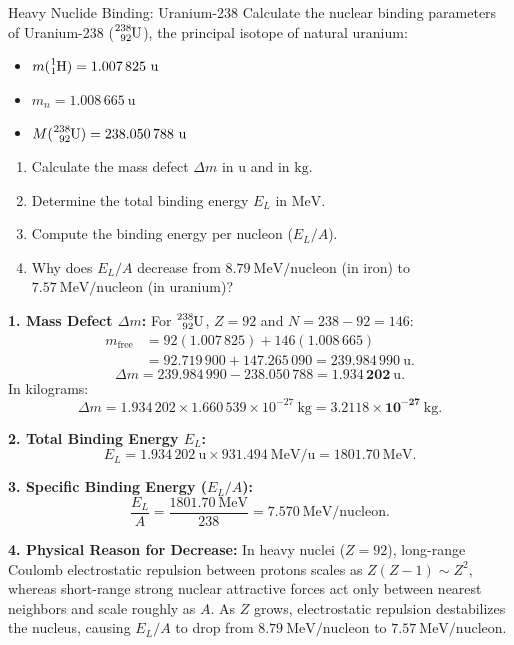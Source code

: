 \begin{exercise}{Heavy Nuclide Binding: Uranium-238}
Calculate the nuclear binding parameters of Uranium-238 ($\ce{^{238}_{92}U}$), the principal isotope of natural uranium:
\begin{itemize}[itemsep=1pt]
  \item $m(\ce{^{1}_{1}H}) = 1.007\,825\ \mathrm{u}$
  \item $m_n = 1.008\,665\ \mathrm{u}$
  \item $M(\ce{^{238}_{92}U}) = 238.050\,788\ \mathrm{u}$
\end{itemize}
\begin{enumerate}[leftmargin=1.5em,itemsep=2pt]
  \item Calculate the mass defect $\Delta m$ in $\mathrm{u}$ and in $\mathrm{kg}$.
  \item Determine the total binding energy $E_L$ in $\mathrm{MeV}$.
  \item Compute the binding energy per nucleon ($E_L/A$).
  \item Why does $E_L/A$ decrease from $8.79\ \mathrm{MeV/nucleon}$ (in iron) to $7.57\ \mathrm{MeV/nucleon}$ (in uranium)?
\end{enumerate}
\end{exercise}

\begin{tabletworkspace}[5.0cm]
\end{tabletworkspace}

\begin{solution}
\textbf{1. Mass Defect $\Delta m$:}
For $\ce{^{238}_{92}U}$, $Z = 92$ and $N = 238 - 92 = 146$:
\begin{align*}
m_{\text{free}} &= 92(1.007\,825) + 146(1.008\,665) \\
                &= 92.719\,900 + 147.265\,090 = 239.984\,990\ \mathrm{u}.
\end{align*}
\[
\Delta m = 239.984\,990 - 238.050\,788 = \mathbf{1.934\,202\ \mathrm{u}}.
\]
In kilograms:
\[
\Delta m = 1.934\,202 \times 1.660\,539 \times 10^{-27}\ \mathrm{kg} = \mathbf{3.2118 \times 10^{-27}\ \mathrm{kg}}.
\]

\textbf{2. Total Binding Energy $E_L$:}
\[
E_L = 1.934\,202\ \mathrm{u} \times 931.494\ \mathrm{MeV/u} = \mathbf{1801.70\ \mathrm{MeV}}.
\]

\textbf{3. Specific Binding Energy ($E_L/A$):}
\[
\frac{E_L}{A} = \frac{1801.70\ \mathrm{MeV}}{238} = \mathbf{7.570\ \mathrm{MeV/nucleon}}.
\]

\textbf{4. Physical Reason for Decrease:}
In heavy nuclei ($Z = 92$), long-range Coulomb electrostatic repulsion between protons scales as $Z(Z-1) \sim Z^2$, whereas short-range strong nuclear attractive forces act only between nearest neighbors and scale roughly as $A$. As $Z$ grows, electrostatic repulsion destabilizes the nucleus, causing $E_L/A$ to drop from $8.79\ \mathrm{MeV/nucleon}$ to $7.57\ \mathrm{MeV/nucleon}$.
\end{solution}

